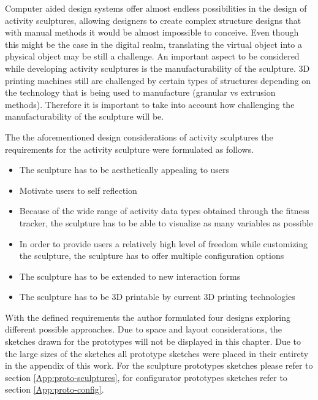 \documentclass[../medieninformatik-arbeit.tex]{subfiles}
\begin{document}
Computer aided design systems offer almost endless possibilities in the design of activity sculptures, allowing designers to create complex structure designs that with manual methods it would be almost impossible to conceive.  Even though this might be the case in the digital realm, translating the virtual object into a physical object may be still a challenge. An important aspect to be considered while developing activity sculptures is the manufacturability of the sculpture\cite{swaminathan2014supporting}. 3D printing machines still are challenged by certain types of structures depending on the technology that is being used to manufacture (granular vs extrusion methods). Therefore it is important to take into account how challenging the manufacturability of the sculpture will be.

The the aforementioned design considerations of activity sculptures the requirements for the activity sculpture were formulated as follows. 

\begin{itemize}
	\item The sculpture has to be aesthetically appealing to users
	\item Motivate users to self reflection
	\item Because of the wide range of activity data types obtained through the fitness tracker, the sculpture has to be able to visualize as many variables as possible
	\item In order to provide users a relatively high level of freedom while customizing the sculpture, the sculpture has to offer multiple configuration options
	\item The sculpture has to be extended to new interaction forms
	\item The sculpture has to be 3D printable by current 3D printing technologies
\end{itemize}

With the defined requirements the author formulated four designs exploring different possible approaches. Due to space and layout considerations, the sketches drawn for the prototypes will not be displayed in this chapter. Due to the large sizes of the sketches all prototype sketches were placed in their entirety in the appendix of this work. For the sculpture prototypes sketches please refer to section \ref{App:proto-sculptures}, for configurator prototypes sketches refer to section \ref{App:proto-config}.
\end{document}
